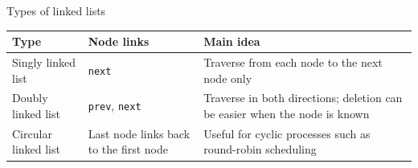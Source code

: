 \documentclass[aspectratio=169]{beamer}
\begin{document}
\begin{frame}{Types of linked lists}
\scriptsize
\begin{center}
\renewcommand{\arraystretch}{1.16}
\begin{tabular}{L{0.22\textwidth}L{0.29\textwidth}L{0.33\textwidth}}
\toprule
\textbf{Type} & \textbf{Node links} & \textbf{Main idea} \\
\midrule
Singly linked list & \texttt{next} & Traverse from each node to the next node only \\
Doubly linked list & \texttt{prev}, \texttt{next} & Traverse in both directions; deletion can be easier when the node is known \\
Circular linked list & Last node links back to the first node & Useful for cyclic processes such as round-robin scheduling \\
\bottomrule
\end{tabular}
\end{center}


\end{frame}
\end{document}
